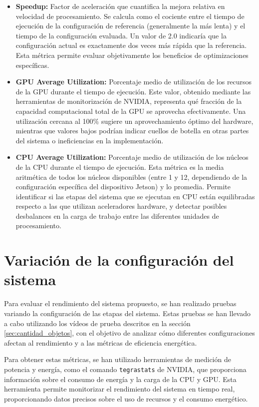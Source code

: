 \documentclass[11pt,spanish,listoffigures,listoftables]{tfgetsinf}
\begin{document}
\begin{itemize}
      \item \textbf{Speedup:} Factor de aceleración que cuantifica la mejora relativa en velocidad de procesamiento. Se calcula como el cociente entre el tiempo de ejecución de la configuración de referencia (generalmente la más lenta) y el tiempo de la configuración evaluada. Un valor de 2.0 indicaría que la configuración actual es exactamente dos veces más rápida que la referencia. Esta métrica permite evaluar objetivamente los beneficios de optimizaciones específicas.

      \item \textbf{GPU Average Utilization:} Porcentaje medio de utilización de los recursos de la GPU durante el tiempo de ejecución. Este valor, obtenido mediante las herramientas de monitorización de NVIDIA, representa qué fracción de la capacidad computacional total de la GPU se aprovecha efectivamente. Una utilización cercana al 100\% sugiere un aprovechamiento óptimo del hardware, mientras que valores bajos podrían indicar cuellos de botella en otras partes del sistema o ineficiencias en la implementación.
      
      \item \textbf{CPU Average Utilization:} Porcentaje medio de utilización de los núcleos de la CPU durante el tiempo de ejecución. Esta métrica es la media aritmética de todos los núcleos disponibles (entre 1 y 12, dependiendo de la configuración específica del dispositivo Jetson) y lo promedia. Permite identificar si las etapas del sistema que se ejecutan en CPU están equilibradas respecto a las que utilizan aceleradores hardware, y detectar posibles desbalances en la carga de trabajo entre las diferentes unidades de procesamiento.

\end{itemize}

\section{Variación de la configuración del sistema} \label{sec:variacion_configuracion}

Para evaluar el rendimiento del sistema propuesto, se han realizado pruebas variando la configuración de las etapas del sistema. Estas pruebas se han llevado a cabo utilizando los vídeos de prueba descritos en la sección \ref{sec:cantidad_objetos}, con el objetivo de analizar cómo diferentes configuraciones afectan al rendimiento y a las métricas de eficiencia energética.


Para obtener estas métricas, se han utilizado herramientas de medición de potencia y energía, como el comando \texttt{tegrastats} de NVIDIA, que proporciona información sobre el consumo de energía y la carga de la CPU y GPU. Esta herramienta permite monitorizar el rendimiento del sistema en tiempo real, proporcionando datos precisos sobre el uso de recursos y el consumo energético.
\end{document}
